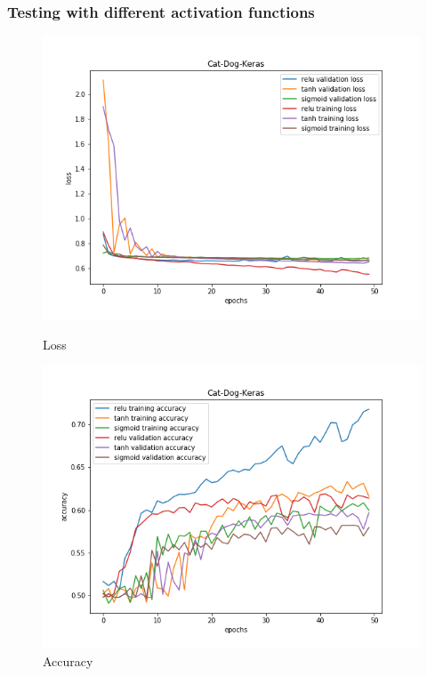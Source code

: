 \documentclass{article}
\begin{document}
\pagebreak
\subsubsection{Testing with different activation functions}

\begin{figure}[!htb]
	\includegraphics[width=\linewidth]{../output_plots/part_2_task_4_activations_loss.png}
	\caption{Loss}\label{fig:part_2_task_4_activations_loss}
	\endminipage\hfill
	\includegraphics[width=\linewidth]{../output_plots/part_2_task_4_activations_accuracy.png}
	\caption{Accuracy}\label{fig:part_2_task_4_activations_accuracy}
	\endminipage\hfill
\end{figure}
\end{document}
